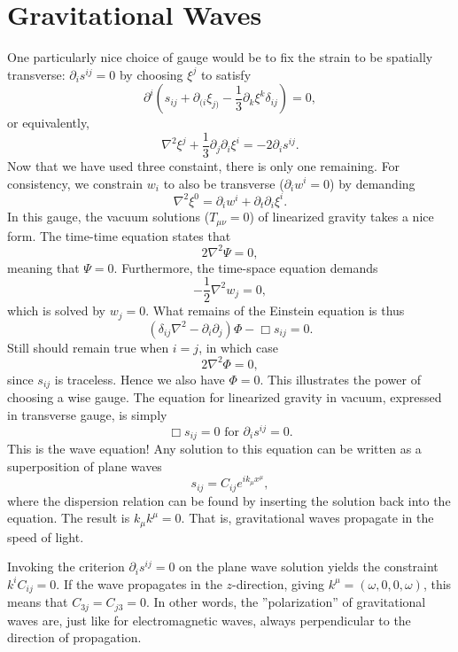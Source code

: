 \documentclass[twoside,utf8]{article}
\begin{document}
\section{Gravitational Waves}
One particularly nice choice of gauge would be to fix the strain to be spatially transverse: $\partial_i s^{ij}=0$ by choosing $\xi^j$ to satisfy
\[
\partial^i \left( s_{ij} + \partial_{(i}\xi_{j)}-\frac{1}{3} \partial_k\xi^k\delta_{ij}\right) = 0,
\]
or equivalently,
\[
\nabla^2 \xi^j + \frac{1}{3}\partial_j \partial_i \xi^i = -2\partial_i s^{ij}.
\]
Now that we have used three constaint, there is only one remaining. For consistency, we constrain $w_i$ to also be transverse ($\partial_iw^i=0$) by demanding
\[
\nabla^2 \xi^0 = \partial_i w^i + \partial_t \partial_i \xi^i.
\]
In this gauge, the vacuum solutions ($T_{\mu\nu}=0$) of linearized gravity takes a nice form. The time-time equation states that
\[
2\nabla^2 \Psi = 0,
\]
meaning that $\Psi=0$. Furthermore, the time-space equation demands
\[
-\frac{1}{2}\nabla^2 w_j=0,
\]
which is solved by $w_j=0$. What remains of the Einstein equation is thus
\[
(\delta_{ij}\nabla^2-\partial_i\partial_j)\Phi
-\Box s_{ij}
= 0.
\]
Still should remain true when $i=j$, in which case
\[
2\nabla^2\Phi
= 0,
\]
since $s_{ij}$ is traceless. Hence we also have $\Phi=0$. This illustrates the power of choosing a wise gauge. The equation for linearized gravity in vacuum, expressed in transverse gauge, is simply
\[
\Box s_{ij} = 0 \text{ for } \partial_i s^{ij}=0.
\]
This is the wave equation! Any solution to this equation can be written as a superposition of plane waves
\[
s_{ij} = C_{ij}e^{ik_\mu x^\mu},
\]
where the dispersion relation can be found by inserting the solution back into the equation. The result is $k_\mu k^\mu = 0$. That is, gravitational waves propagate in the speed of light.

Invoking the criterion $\partial_i s^{ij}=0$ on the plane wave solution yields the constraint $k^i C_{ij} = 0$. If the wave propagates in the $z$-direction, giving $k^\mu=(\omega,0,0,\omega)$, this means that $C_{3j}=C_{j3}=0$. In other words, the ''polarization'' of gravitational waves are, just like for electromagnetic waves, always perpendicular to the direction of propagation.
\end{document}
